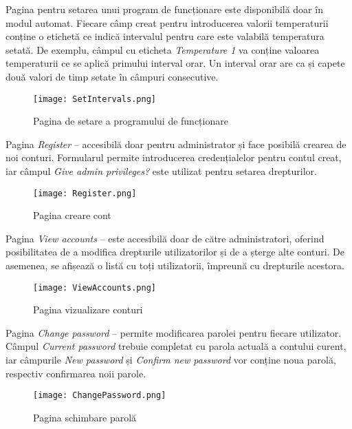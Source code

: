 	Pagina pentru setarea unui program de funcționare este disponibilă doar în modul automat. Fiecare câmp creat pentru introducerea valorii temperaturii conține o etichetă ce indică intervalul pentru care este valabilă temperatura setată. De exemplu, câmpul cu eticheta \textit{Temperature 1} va conține valoarea temperaturii ce se aplică primului interval orar. Un interval orar are ca și capete două valori de timp setate în câmpuri consecutive.  

\begin{figure}[H]
   	\centering
    	\texttt{[image: SetIntervals.png]}
	\caption{Pagina de setare a programului de funcționare}
\end{figure}

	Pagina \textit{Register} – accesibilă doar pentru administrator și face posibilă crearea de noi conturi. Formularul permite introducerea credențialelor pentru contul creat, iar câmpul \textit{Give admin privileges?} este utilizat pentru setarea drepturilor.

\begin{figure}[H]
   	\centering
    	\texttt{[image: Register.png]}
	\caption{Pagina creare cont}
\end{figure}

	Pagina \textit{View accounts} – este accesibilă doar de către administratori, oferind posibilitatea de a modifica drepturile utilizatorilor și de a șterge alte conturi. De asemenea, se afișează o listă cu toți utilizatorii, împreună cu drepturile acestora.

\begin{figure}[H]
   	\centering
    	\texttt{[image: ViewAccounts.png]}
	\caption{Pagina vizualizare conturi}
\end{figure}

	Pagina \textit{Change password} – permite modificarea parolei pentru fiecare utilizator. Câmpul \textit{Current password} trebuie completat cu parola actuală a contului curent, iar câmpurile \textit{New password} și \textit{Confirm new password} vor conține noua parolă, respectiv confirmarea noii parole.

\begin{figure}[H]
   	\centering
    	\texttt{[image: ChangePassword.png]}
	\caption{Pagina schimbare parolă}
\end{figure}

\vspace{5em}

